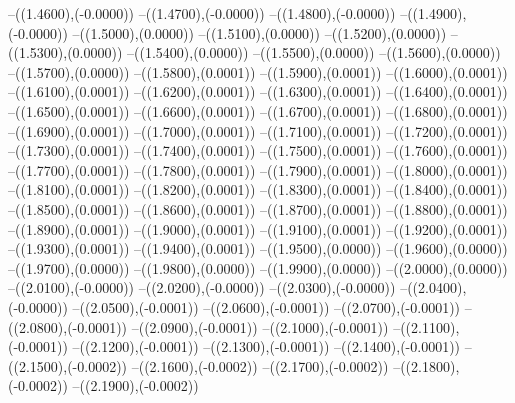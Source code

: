 {	--({\sx*(1.4600)},{\sy*(-0.0000)})
	--({\sx*(1.4700)},{\sy*(-0.0000)})
	--({\sx*(1.4800)},{\sy*(-0.0000)})
	--({\sx*(1.4900)},{\sy*(-0.0000)})
	--({\sx*(1.5000)},{\sy*(0.0000)})
	--({\sx*(1.5100)},{\sy*(0.0000)})
	--({\sx*(1.5200)},{\sy*(0.0000)})
	--({\sx*(1.5300)},{\sy*(0.0000)})
	--({\sx*(1.5400)},{\sy*(0.0000)})
	--({\sx*(1.5500)},{\sy*(0.0000)})
	--({\sx*(1.5600)},{\sy*(0.0000)})
	--({\sx*(1.5700)},{\sy*(0.0000)})
	--({\sx*(1.5800)},{\sy*(0.0001)})
	--({\sx*(1.5900)},{\sy*(0.0001)})
	--({\sx*(1.6000)},{\sy*(0.0001)})
	--({\sx*(1.6100)},{\sy*(0.0001)})
	--({\sx*(1.6200)},{\sy*(0.0001)})
	--({\sx*(1.6300)},{\sy*(0.0001)})
	--({\sx*(1.6400)},{\sy*(0.0001)})
	--({\sx*(1.6500)},{\sy*(0.0001)})
	--({\sx*(1.6600)},{\sy*(0.0001)})
	--({\sx*(1.6700)},{\sy*(0.0001)})
	--({\sx*(1.6800)},{\sy*(0.0001)})
	--({\sx*(1.6900)},{\sy*(0.0001)})
	--({\sx*(1.7000)},{\sy*(0.0001)})
	--({\sx*(1.7100)},{\sy*(0.0001)})
	--({\sx*(1.7200)},{\sy*(0.0001)})
	--({\sx*(1.7300)},{\sy*(0.0001)})
	--({\sx*(1.7400)},{\sy*(0.0001)})
	--({\sx*(1.7500)},{\sy*(0.0001)})
	--({\sx*(1.7600)},{\sy*(0.0001)})
	--({\sx*(1.7700)},{\sy*(0.0001)})
	--({\sx*(1.7800)},{\sy*(0.0001)})
	--({\sx*(1.7900)},{\sy*(0.0001)})
	--({\sx*(1.8000)},{\sy*(0.0001)})
	--({\sx*(1.8100)},{\sy*(0.0001)})
	--({\sx*(1.8200)},{\sy*(0.0001)})
	--({\sx*(1.8300)},{\sy*(0.0001)})
	--({\sx*(1.8400)},{\sy*(0.0001)})
	--({\sx*(1.8500)},{\sy*(0.0001)})
	--({\sx*(1.8600)},{\sy*(0.0001)})
	--({\sx*(1.8700)},{\sy*(0.0001)})
	--({\sx*(1.8800)},{\sy*(0.0001)})
	--({\sx*(1.8900)},{\sy*(0.0001)})
	--({\sx*(1.9000)},{\sy*(0.0001)})
	--({\sx*(1.9100)},{\sy*(0.0001)})
	--({\sx*(1.9200)},{\sy*(0.0001)})
	--({\sx*(1.9300)},{\sy*(0.0001)})
	--({\sx*(1.9400)},{\sy*(0.0001)})
	--({\sx*(1.9500)},{\sy*(0.0000)})
	--({\sx*(1.9600)},{\sy*(0.0000)})
	--({\sx*(1.9700)},{\sy*(0.0000)})
	--({\sx*(1.9800)},{\sy*(0.0000)})
	--({\sx*(1.9900)},{\sy*(0.0000)})
	--({\sx*(2.0000)},{\sy*(0.0000)})
	--({\sx*(2.0100)},{\sy*(-0.0000)})
	--({\sx*(2.0200)},{\sy*(-0.0000)})
	--({\sx*(2.0300)},{\sy*(-0.0000)})
	--({\sx*(2.0400)},{\sy*(-0.0000)})
	--({\sx*(2.0500)},{\sy*(-0.0001)})
	--({\sx*(2.0600)},{\sy*(-0.0001)})
	--({\sx*(2.0700)},{\sy*(-0.0001)})
	--({\sx*(2.0800)},{\sy*(-0.0001)})
	--({\sx*(2.0900)},{\sy*(-0.0001)})
	--({\sx*(2.1000)},{\sy*(-0.0001)})
	--({\sx*(2.1100)},{\sy*(-0.0001)})
	--({\sx*(2.1200)},{\sy*(-0.0001)})
	--({\sx*(2.1300)},{\sy*(-0.0001)})
	--({\sx*(2.1400)},{\sy*(-0.0001)})
	--({\sx*(2.1500)},{\sy*(-0.0002)})
	--({\sx*(2.1600)},{\sy*(-0.0002)})
	--({\sx*(2.1700)},{\sy*(-0.0002)})
	--({\sx*(2.1800)},{\sy*(-0.0002)})
	--({\sx*(2.1900)},{\sy*(-0.0002)})
}
